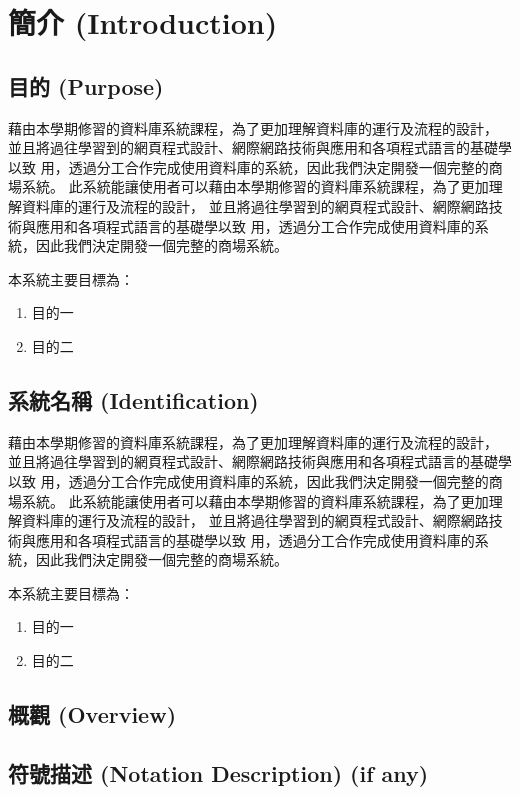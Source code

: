 \documentclass[a4paper, 12pt]{article}
\begin{document}

\section{簡介 (Introduction)}

\subsection{目的 (Purpose)}

藉由本學期修習的資料庫系統課程，為了更加理解資料庫的運行及流程的設計，
並且將過往學習到的網頁程式設計、網際網路技術與應用和各項程式語言的基礎學以致
用，透過分工合作完成使用資料庫的系統，因此我們決定開發一個完整的商場系統。
此系統能讓使用者可以藉由本學期修習的資料庫系統課程，為了更加理解資料庫的運行及流程的設計，
並且將過往學習到的網頁程式設計、網際網路技術與應用和各項程式語言的基礎學以致
用，透過分工合作完成使用資料庫的系統，因此我們決定開發一個完整的商場系統。

本系統主要目標為：
\begin{enumerate}
  \item 目的一
  \item 目的二
\end{enumerate}

\subsection{系統名稱 (Identification)}

藉由本學期修習的資料庫系統課程，為了更加理解資料庫的運行及流程的設計，
並且將過往學習到的網頁程式設計、網際網路技術與應用和各項程式語言的基礎學以致
用，透過分工合作完成使用資料庫的系統，因此我們決定開發一個完整的商場系統。
此系統能讓使用者可以藉由本學期修習的資料庫系統課程，為了更加理解資料庫的運行及流程的設計，
並且將過往學習到的網頁程式設計、網際網路技術與應用和各項程式語言的基礎學以致
用，透過分工合作完成使用資料庫的系統，因此我們決定開發一個完整的商場系統。

本系統主要目標為：
\begin{enumerate}
  \item 目的一
  \item 目的二
\end{enumerate}

\subsection{概觀 (Overview)}
\subsection{符號描述 (Notation Description) (if any)}
\end{document}

